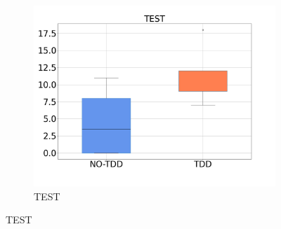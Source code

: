 \begin{figure}[htbp]
\begin{subfigure}{0.33\textwidth}
        \includegraphics[width=\linewidth]{figures/box_plots/task3/TEST.png}
        \caption{TEST}
        \label{bp_task3_test}
    \end{subfigure}


\end{figure}
